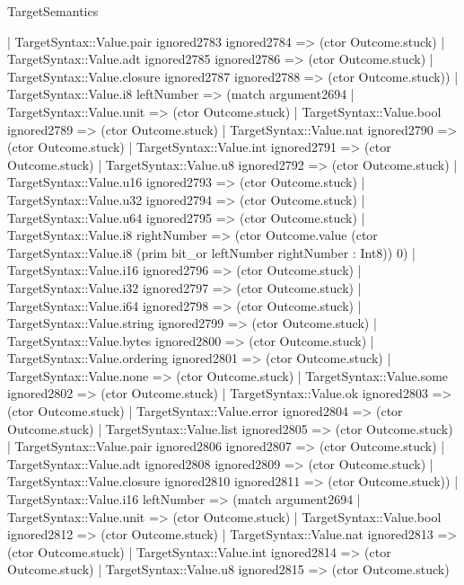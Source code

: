 \begin{lexlean}{TargetSemantics}
\begin{semanticmodule}
{              | TargetSyntax::Value.pair ignored2783 ignored2784 => (ctor Outcome.stuck)
              | TargetSyntax::Value.adt ignored2785 ignored2786 => (ctor Outcome.stuck)
              | TargetSyntax::Value.closure ignored2787 ignored2788 => (ctor Outcome.stuck))
            | TargetSyntax::Value.i8 leftNumber => (match argument2694
              | TargetSyntax::Value.unit => (ctor Outcome.stuck)
              | TargetSyntax::Value.bool ignored2789 => (ctor Outcome.stuck)
              | TargetSyntax::Value.nat ignored2790 => (ctor Outcome.stuck)
              | TargetSyntax::Value.int ignored2791 => (ctor Outcome.stuck)
              | TargetSyntax::Value.u8 ignored2792 => (ctor Outcome.stuck)
              | TargetSyntax::Value.u16 ignored2793 => (ctor Outcome.stuck)
              | TargetSyntax::Value.u32 ignored2794 => (ctor Outcome.stuck)
              | TargetSyntax::Value.u64 ignored2795 => (ctor Outcome.stuck)
              | TargetSyntax::Value.i8 rightNumber => (ctor Outcome.value (ctor TargetSyntax::Value.i8 (prim bit_or leftNumber rightNumber : Int8)) 0)
              | TargetSyntax::Value.i16 ignored2796 => (ctor Outcome.stuck)
              | TargetSyntax::Value.i32 ignored2797 => (ctor Outcome.stuck)
              | TargetSyntax::Value.i64 ignored2798 => (ctor Outcome.stuck)
              | TargetSyntax::Value.string ignored2799 => (ctor Outcome.stuck)
              | TargetSyntax::Value.bytes ignored2800 => (ctor Outcome.stuck)
              | TargetSyntax::Value.ordering ignored2801 => (ctor Outcome.stuck)
              | TargetSyntax::Value.none => (ctor Outcome.stuck)
              | TargetSyntax::Value.some ignored2802 => (ctor Outcome.stuck)
              | TargetSyntax::Value.ok ignored2803 => (ctor Outcome.stuck)
              | TargetSyntax::Value.error ignored2804 => (ctor Outcome.stuck)
              | TargetSyntax::Value.list ignored2805 => (ctor Outcome.stuck)
              | TargetSyntax::Value.pair ignored2806 ignored2807 => (ctor Outcome.stuck)
              | TargetSyntax::Value.adt ignored2808 ignored2809 => (ctor Outcome.stuck)
              | TargetSyntax::Value.closure ignored2810 ignored2811 => (ctor Outcome.stuck))
            | TargetSyntax::Value.i16 leftNumber => (match argument2694
              | TargetSyntax::Value.unit => (ctor Outcome.stuck)
              | TargetSyntax::Value.bool ignored2812 => (ctor Outcome.stuck)
              | TargetSyntax::Value.nat ignored2813 => (ctor Outcome.stuck)
              | TargetSyntax::Value.int ignored2814 => (ctor Outcome.stuck)
              | TargetSyntax::Value.u8 ignored2815 => (ctor Outcome.stuck)
}
\end{semanticmodule}
\end{lexlean}
